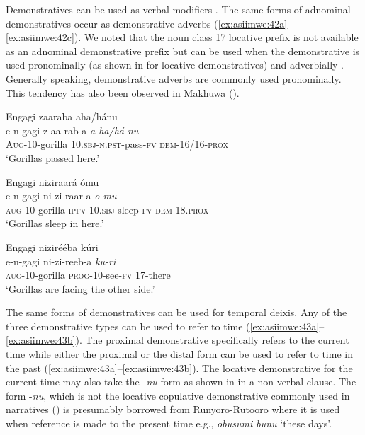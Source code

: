 \documentclass[output=paper 		  ]{langscibook}
\begin{document}
Demonstratives can be used as verbal modifiers \citep{Diessel1999}. The same forms of adnominal demonstratives occur as demonstrative adverbs (\ref{ex:asiimwe:42a}--\ref{ex:asiimwe:42c}). We noted that the noun class 17 locative prefix is not available as an adnominal demonstrative prefix but can be used when the demonstrative is used pronominally (as shown in  for locative demonstratives) and adverbially . Generally speaking, demonstrative adverbs are commonly used pronominally. This tendency has also been observed in Makhuwa (\citealt{vanderWal2010}).

\ea%
    \label{ex:asiimwe:42}
    \ea\label{ex:asiimwe:42a}  Engagi zaaraba aha/hánu\\
    \gll e-n-gagi  z-aa-rab-a    \emph{a-ha/há-nu}\\
    \textsc{Aug}{}-10-gorilla  \textsc{10.sbj-n.pst}{}-pass-\textsc{fv}  \textsc{dem}{}-16/16-\textsc{prox}\\
  \glt ‘Gorillas passed here.’

  \ex\label{ex:asiimwe:42b}  Engagi niziraará ómu\\
    \gll e-n-gagi  ni-zi-raar-a  \emph{o-mu}\\
    \textsc{aug-}10-gorilla  \textsc{ipfv}{}-\textsc{10.sbj-}sleep-\textsc{fv}  \textsc{dem}{}-18.\textsc{prox}\\
    \glt ‘Gorillas sleep in here.’

    \ex\label{ex:asiimwe:42c}  Engagi nizirééba kúri\\
    \gll e-n-gagi  ni-zi-reeb-a  \emph{ku-ri}\\
\textsc{aug}{}-10-gorilla  \textsc{prog}{}-10-see-\textsc{fv}  17-there\\
\glt ‘Gorillas are facing the other side.’
    \z
\z

The same forms of demonstratives can be used for temporal deixis. Any of the three demonstrative types can be used to refer to time (\ref{ex:asiimwe:43a}--\ref{ex:asiimwe:43b}). The proximal demonstrative specifically refers to the current time  while either the proximal or the distal form can be used to refer to time in the past (\ref{ex:asiimwe:43a}--\ref{ex:asiimwe:43b}). The locative demonstrative for the current time may also take the \textit{{}-nu} form as shown in  in a non-verbal clause. The form -\textit{nu}, which is not the locative copulative demonstrative commonly used in narratives () is presumably borrowed from Runyoro-Rutooro where it is used when reference is made to the present time e.g., \textit{obusumi bunu} ‘these days’.
\end{document}
